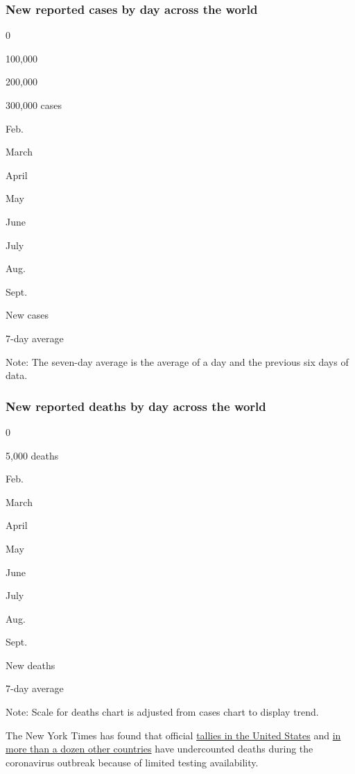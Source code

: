 \hypertarget{new-reported-cases-by-day-across-the-world}{%
\subsubsection{New reported cases by day across the
world}\label{new-reported-cases-by-day-across-the-world}}

0

100,000

200,000

300,000 cases

Feb.

March

April

May

June

July

Aug.

Sept.

New cases

7-day average

Note: The seven-day average is the average of a day and the previous six
days of data.

\hypertarget{new-reported-deaths-by-day-across-the-world}{%
\subsubsection{New reported deaths by day across the
world}\label{new-reported-deaths-by-day-across-the-world}}

0

5,000 deaths

Feb.

March

April

May

June

July

Aug.

Sept.

New deaths

7-day average

Note: Scale for deaths chart is adjusted from cases chart to display
trend.

The New York Times has found that official
\href{https://www.nytimes3xbfgragh.onion/interactive/2020/08/12/us/covid-deaths-us.html}{tallies
in the United States} and
\href{https://www.nytimes3xbfgragh.onion/interactive/2020/04/21/world/coronavirus-missing-deaths.html}{in
more than a dozen other countries} have undercounted deaths during the
coronavirus outbreak because of limited testing availability.

